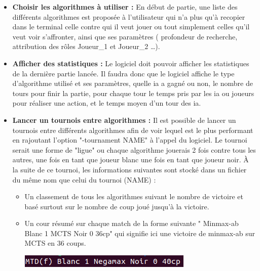 \documentclass{article}
\begin{document}
\begin{itemize}
    \item \textbf{Choisir les algorithmes à utiliser : }
        \newline
        En début de partie, une liste des différents algorithmes est proposée à l'utilisateur qui n'a plus qu'à recopier dans le terminal celle contre qui il veut jouer ou tout simplement celles qu'il veut voir s'affronter, ainsi que ses paramètres ( profondeur de recherche, attribution des rôles Joueur\_1 et Joueur\_2 \dots).
    \medskip
    \item \textbf{Afficher des statistiques :
    }
        \newline
        Le logiciel doit pouvoir afficher les statistiques de la dernière partie lancée. 
        \newline
        Il faudra donc que le logiciel affiche le type d'algorithme utilisé et ses paramètres, quelle ia a gagné ou non, le nombre de tours pour finir la partie, pour chaque tour le temps pris par les ia ou joueurs pour réaliser une action, et le temps moyen d'un tour des ia.
    \medskip
    \item \textbf{Lancer un tournois entre algorithmes : }
    \newline
        Il est possible de lancer un tournois entre différents algorithmes afin de voir lequel est le plus performant en rajoutant l'option "-tournament NAME" à l'appel du logiciel.
        Le tournoi serait une forme de "ligue" ou chaque algorithme jouerais 2 fois contre tous les autres, une fois en tant que joueur blanc une fois en tant que joueur noir.
        \newline
        À la suite de ce tournoi, les informations suivantes sont stocké dans un fichier du même nom que celui du tournoi (NAME) :
        \begin{itemize}
            \item Un classement de tous les algorithmes suivant le nombre de victoire et basé surtout sur le nombre de coup joué jusqu'à la victoire.
            \item Un cour résumé sur chaque match de la forme suivante " Minmax-ab Blanc 1 MCTS Noir 0 36cp" qui signifie ici une victoire de minmax-ab sur MCTS en 36 coups.
            \newline
            \centerline{\includegraphics[scale = 0.5]{img/Summarytournament.png}}
        \end{itemize}
    \medskip

\end{itemize}
\end{document}
